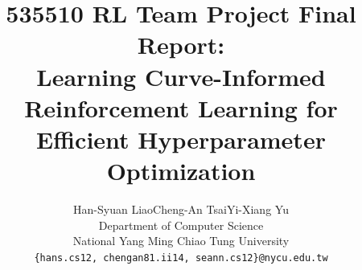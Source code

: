 \documentclass{article}
\title{535510 RL Team Project Final Report: \\ Learning Curve-Informed Reinforcement Learning for Efficient Hyperparameter Optimization}
\author{%
  Han-Syuan Liao\quad Cheng-An Tsai\quad Yi-Xiang Yu\\
  Department of Computer Science\\
  National Yang Ming Chiao Tung University\\
  \texttt{\{hans.cs12, chengan81.ii14, seann.cs12\}@nycu.edu.tw}
}
\begin{document}
\maketitle

















\newpage
{
\small


}
\end{document}
